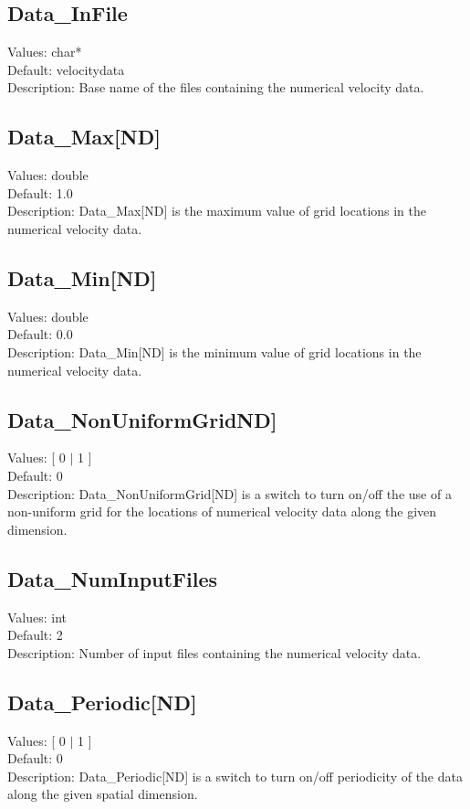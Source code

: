 \documentclass[11pt]{article}
\begin{document}
\subsection{Data\_InFile}
Values:   char*\\
Default:  velocitydata\\
Description:  Base name of the files containing the numerical velocity data. 

\subsection{Data\_Max[ND]}
Values:   double \\
Default:  1.0\\
Description: Data\_Max[ND] is the maximum value of grid locations in the numerical velocity data. 

\subsection{Data\_Min[ND]}
Values:   double \\
Default:  0.0\\
Description: Data\_Min[ND] is the minimum value of grid locations in the numerical velocity data. 

\subsection{Data\_NonUniformGridND]}
Values:   [ 0 $|$ 1 ]  \\
Default:  0\\
Description:  Data\_NonUniformGrid[ND] is a switch to turn on/off the use of a non-uniform grid for the locations of numerical velocity data along the given dimension.

\subsection{Data\_NumInputFiles}
Values:   int\\
Default:  2\\
Description:  Number of input files containing the numerical velocity data.

\subsection{Data\_Periodic[ND]}
Values:   [ 0 $|$ 1 ]  \\
Default:  0\\
Description:  Data\_Periodic[ND] is a switch to turn on/off periodicity of the data along the given spatial dimension.
\end{document}
